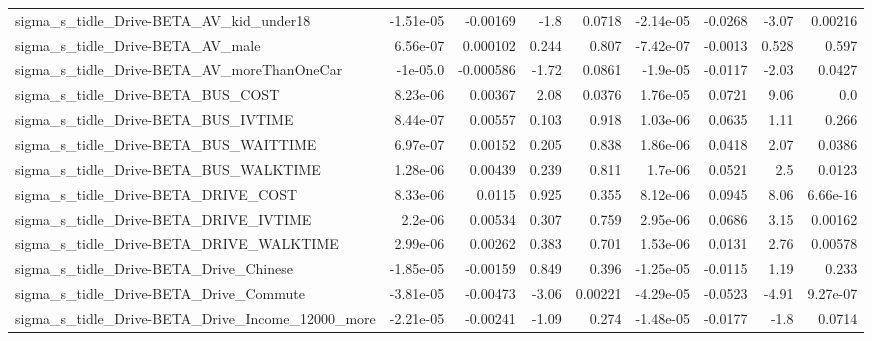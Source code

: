 \begin{tabular}{lrrrrrrrr}
sigma\_s\_tidle\_Drive-BETA\_AV\_kid\_under18            &   -1.51e-05 &     -0.00169 &      -1.8 &   0.0718 &  -2.14e-05 &     -0.0268 &        -3.07 &       0.00216 \\
sigma\_s\_tidle\_Drive-BETA\_AV\_male                   &    6.56e-07 &     0.000102 &     0.244 &    0.807 &  -7.42e-07 &     -0.0013 &        0.528 &         0.597 \\
sigma\_s\_tidle\_Drive-BETA\_AV\_moreThanOneCar         &    -1e-05.0 &    -0.000586 &     -1.72 &   0.0861 &   -1.9e-05 &     -0.0117 &        -2.03 &        0.0427 \\
sigma\_s\_tidle\_Drive-BETA\_BUS\_COST                  &    8.23e-06 &      0.00367 &      2.08 &   0.0376 &   1.76e-05 &      0.0721 &         9.06 &           0.0 \\
sigma\_s\_tidle\_Drive-BETA\_BUS\_IVTIME                &    8.44e-07 &      0.00557 &     0.103 &    0.918 &   1.03e-06 &      0.0635 &         1.11 &         0.266 \\
sigma\_s\_tidle\_Drive-BETA\_BUS\_WAITTIME              &    6.97e-07 &      0.00152 &     0.205 &    0.838 &   1.86e-06 &      0.0418 &         2.07 &        0.0386 \\
sigma\_s\_tidle\_Drive-BETA\_BUS\_WALKTIME              &    1.28e-06 &      0.00439 &     0.239 &    0.811 &    1.7e-06 &      0.0521 &          2.5 &        0.0123 \\
sigma\_s\_tidle\_Drive-BETA\_DRIVE\_COST                &    8.33e-06 &       0.0115 &     0.925 &    0.355 &   8.12e-06 &      0.0945 &         8.06 &      6.66e-16 \\
sigma\_s\_tidle\_Drive-BETA\_DRIVE\_IVTIME              &     2.2e-06 &      0.00534 &     0.307 &    0.759 &   2.95e-06 &      0.0686 &         3.15 &       0.00162 \\
sigma\_s\_tidle\_Drive-BETA\_DRIVE\_WALKTIME            &    2.99e-06 &      0.00262 &     0.383 &    0.701 &   1.53e-06 &      0.0131 &         2.76 &       0.00578 \\
sigma\_s\_tidle\_Drive-BETA\_Drive\_Chinese             &   -1.85e-05 &     -0.00159 &     0.849 &    0.396 &  -1.25e-05 &     -0.0115 &         1.19 &         0.233 \\
sigma\_s\_tidle\_Drive-BETA\_Drive\_Commute             &   -3.81e-05 &     -0.00473 &     -3.06 &  0.00221 &  -4.29e-05 &     -0.0523 &        -4.91 &      9.27e-07 \\
sigma\_s\_tidle\_Drive-BETA\_Drive\_Income\_12000\_more   &   -2.21e-05 &     -0.00241 &     -1.09 &    0.274 &  -1.48e-05 &     -0.0177 &         -1.8 &        0.0714 \\

\end{tabular}
